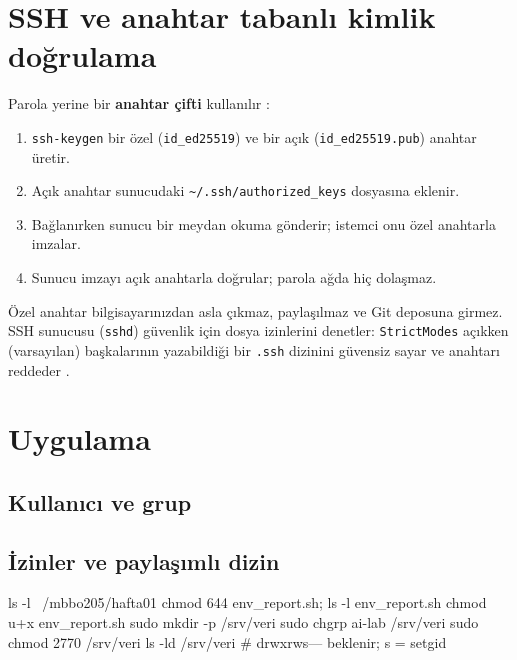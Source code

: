 \documentclass[11pt,a4paper]{article}
\begin{document}
\section{SSH ve anahtar tabanlı kimlik doğrulama}
Parola yerine bir \textbf{anahtar çifti} kullanılır \cite{sshkeygen}:
\begin{enumerate}
  \item \texttt{ssh-keygen} bir özel (\texttt{id\_ed25519}) ve bir açık (\texttt{id\_ed25519.pub}) anahtar üretir.
  \item Açık anahtar sunucudaki \texttt{\textasciitilde/.ssh/authorized\_keys} dosyasına eklenir.
  \item Bağlanırken sunucu bir meydan okuma gönderir; istemci onu özel anahtarla imzalar.
  \item Sunucu imzayı açık anahtarla doğrular; parola ağda hiç dolaşmaz.
\end{enumerate}
Özel anahtar bilgisayarınızdan asla çıkmaz, paylaşılmaz ve Git deposuna girmez. SSH sunucusu (\texttt{sshd}) güvenlik için dosya izinlerini denetler: \texttt{StrictModes} açıkken (varsayılan) başkalarının yazabildiği bir \texttt{.ssh} dizinini güvensiz sayar ve anahtarı reddeder \cite{sshdconfig}.

\section{Uygulama}

\subsection{Kullanıcı ve grup}

\subsection{İzinler ve paylaşımlı dizin}
\begin{kodblok}
ls -l ~/mbbo205/hafta01
chmod 644 env_report.sh; ls -l env_report.sh
chmod u+x env_report.sh
sudo mkdir -p /srv/veri
sudo chgrp ai-lab /srv/veri
sudo chmod 2770 /srv/veri
ls -ld /srv/veri                   # drwxrws--- beklenir; s = setgid
\end{kodblok}
\end{document}
